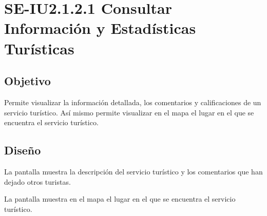 \newpage
\section{SE-IU2.1.2.1 Consultar Información y Estadísticas Turísticas}

\subsection{Objetivo}
Permite visualizar la información detallada, los comentarios y calificaciones de un servicio turístico. Así mismo permite visualizar en el mapa el lugar en el que se encuentra el servicio turístico.

\subsection{Diseño}
La pantalla  muestra la descripción del servicio turístico y los comentarios que han dejado otros turistas.


\newpage
La pantalla  muestra en el mapa el lugar en el que se encuentra el servicio turístico.
